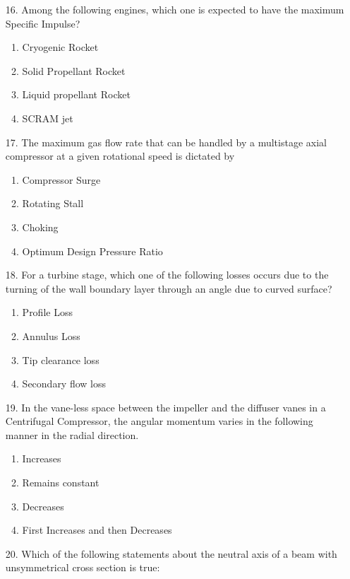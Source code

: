 \documentclass[journal]{IEEEtran}
\begin{document}
\begin{enumerate}
    \item[16.] Among the following engines, which one is expected to have the maximum Specific Impulse?
    \begin{enumerate}[label=(\Alph*)]
        \item Cryogenic Rocket
        \item Solid Propellant Rocket
        \item Liquid propellant Rocket
        \item SCRAM jet
    \end{enumerate}
    \item[17.] The maximum gas flow rate that can be handled by a multistage axial compressor at a given rotational speed is dictated by 
    \begin{enumerate}[label=(\Alph*)]
        \item Compressor Surge
        \item Rotating Stall
        \item Choking
        \item Optimum Design Pressure Ratio 
    \end{enumerate}
    \item[18.] For a turbine stage, which one of the following losses occurs due to the turning of the wall boundary layer through an angle due to curved surface?
    \begin{enumerate}[label=(\Alph*)]
        \item Profile Loss 
        \item Annulus Loss 
        \item Tip clearance loss 
        \item Secondary flow loss 
    \end{enumerate}
    \item[19.] In the vane-less space between the impeller and the diffuser vanes in a Centrifugal Compressor, the angular momentum varies in the following manner in the radial direction. 
    \begin{enumerate}[label=(\Alph*)]
        \item Increases
        \item Remains constant
        \item Decreases
        \item First Increases and then Decreases
    \end{enumerate}
    \item[20.] Which of the following statements about the neutral axis of a beam with unsymmetrical cross section is true: 

\end{enumerate}
\end{document}
